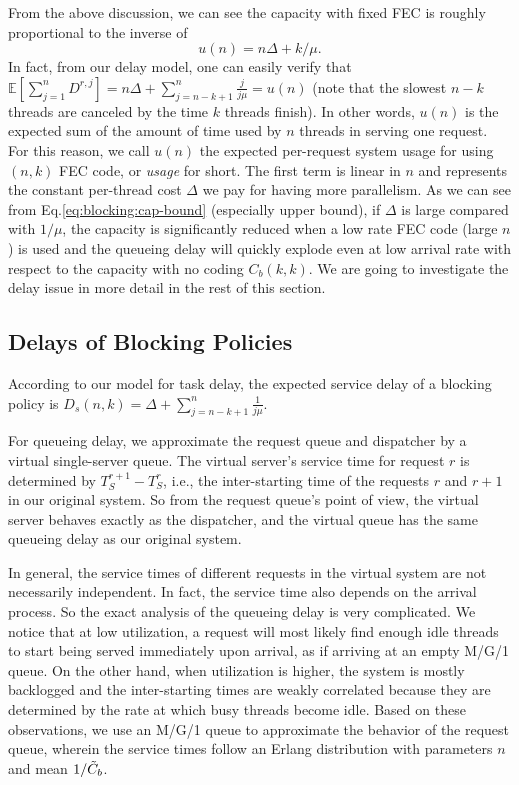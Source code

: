 \documentclass[journal]{IEEEtran}
\newcommand{\Expect}{\mathbb{E}}
\begin{document}
From the above discussion, we can see the capacity with fixed FEC is roughly proportional to the inverse of $$u(n) = n\Delta + k/\mu.$$ In fact, from our delay model, one can easily verify that $\Expect[\sum_{j=1}^n D^{r,j}] = n\Delta + \sum_{j=n-k+1}^n \frac{j}{j\mu} =u(n) $ (note that the slowest $n-k$ threads are canceled by the time $k$ threads finish). In other words, $u(n)$ is the expected sum of the amount of time used by $n$ threads in serving one request. For this reason, we call $u(n)$ the expected per-request system usage for using $(n,k)$ FEC code, or {\em usage} for short. The first term is linear in $n$ and represents the constant per-thread cost $\Delta$ we pay for having more parallelism. As we can see from Eq.\ref{eq:blocking:cap-bound} (especially upper bound), if $\Delta$ is large compared with $1/\mu$, the capacity is significantly reduced when a low rate FEC code (large $n$) is used and the queueing delay will quickly explode even at low arrival rate with respect to the capacity with no coding $C_b(k,k)$. We are going to investigate the delay issue in more detail in the rest of this section.

\subsection{Delays of Blocking Policies}
According to our model for task delay, the expected service delay of a blocking policy is $D_s(n,k) = \Delta +\sum_{j=n-k+1}^n \frac{1}{j\mu}$.

For queueing delay, we approximate the request queue and dispatcher by a virtual single-server queue. The virtual server's service time for request $r$ is determined by $T_S^{r+1} - T_S^r$, i.e., the inter-starting time of the requests $r$ and $r+1$ in our original system. So from the request queue's point of view, the virtual server behaves exactly as the dispatcher, and the virtual queue has the same queueing delay as our original system.

In general, the service times of different requests in the virtual system are not necessarily independent. In fact, the service time also depends on the arrival process. 
So the exact analysis of the queueing delay is very complicated. 
We notice that at low utilization, a request will most likely find enough idle threads to start being served immediately upon arrival, as if arriving at an empty M/G/1 queue. On the other hand, when utilization is higher, the system is mostly backlogged and the inter-starting times are weakly correlated because they are determined by the rate at which busy threads become idle. Based on these observations, we use an M/G/1 queue to approximate the behavior of the request queue, wherein the service times follow an Erlang distribution with parameters $n$ and mean $1/\tilde{C}_b$. 
\end{document}
